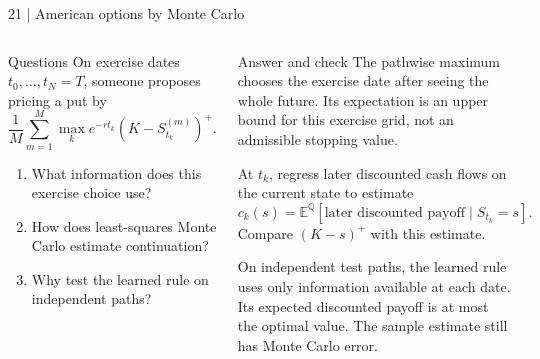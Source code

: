 \documentclass[handout,10pt,t,aspectratio=169]{beamer}
\newcommand{\E}{\mathbb E}
\newcommand{\Q}{\mathbb Q}
\newenvironment{questions}{\begin{block}{Questions}}{\end{block}}
\newenvironment{answers}{\begin{exampleblock}{Answer and check}}{\end{exampleblock}}
\newcommand{\compact}{\small%
 \setlength{\abovedisplayskip}{3pt}%
 \setlength{\belowdisplayskip}{3pt}%
 \setlength{\abovedisplayshortskip}{2pt}%
 \setlength{\belowdisplayshortskip}{2pt}%
 \setlength{\parskip}{2pt}}
\begin{document}
\begin{frame}{21 | American options by Monte Carlo}
\compact
\begin{columns}[T,onlytextwidth]
\begin{questions}
On exercise dates \(t_0,\ldots,t_N=T\), someone proposes pricing a put by
\[
 \frac1M\sum_{m=1}^M\max_k
 e^{-rt_k}(K-S_{t_k}^{(m)})^+.
\]
\begin{enumerate}
\item What information does this exercise choice use?
\item How does least-squares Monte Carlo estimate continuation?
\item Why test the learned rule on independent paths?
\end{enumerate}
\end{questions}
\begin{answers}
The pathwise maximum chooses the exercise date after seeing the whole
future. Its expectation is an upper bound for this exercise grid,
not an admissible stopping value.

At \(t_k\), regress later discounted cash flows on the current state to estimate
\[
 c_k(s)=\E^\Q[\text{later discounted payoff}\mid S_{t_k}=s].
\]
Compare \((K-s)^+\) with this estimate.

On independent test paths, the learned rule uses only information
available at each date. Its expected discounted payoff is at most the
optimal value. The sample estimate still has Monte Carlo error.
\end{answers}
\end{columns}
\end{frame}
\end{document}
